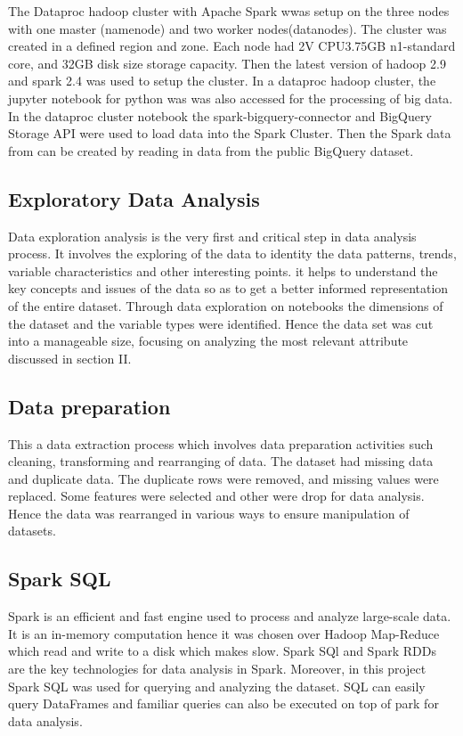 \documentclass[11pt]{article}
\begin{document}
The Dataproc hadoop cluster with Apache Spark wwas setup on the three nodes with one master (namenode) and two worker nodes(datanodes). The cluster was created in a defined region and zone. Each node had 2V CPU3.75GB n1-standard core, and 32GB disk size storage capacity. Then the latest version of hadoop 2.9 and spark 2.4 was used to setup the cluster. In a dataproc hadoop cluster, the jupyter notebook for python was was also accessed for the processing of big data.  In the dataproc cluster notebook the spark-bigquery-connector and BigQuery Storage API were used to  load data into the Spark Cluster. Then the Spark data from can be created by reading in data from the public BigQuery dataset. 

\subsection{ Exploratory Data Analysis}
Data exploration analysis is the very first and critical step in data analysis process. It involves the exploring of the data to identity the data patterns, trends, variable characteristics and other interesting points. it helps to understand the key concepts and issues of the data so as to get a better informed representation of the entire dataset. Through data exploration on notebooks the dimensions of the dataset and the variable types were identified. Hence the data set was cut into a manageable size, focusing on analyzing the most relevant attribute discussed in section II. 

\subsection{Data preparation}
 This a data extraction process which involves data preparation activities such cleaning, transforming and rearranging of data. The dataset had missing data and duplicate data. The duplicate rows were removed, and missing values were replaced. Some features were selected and other were drop for data analysis. Hence the data was rearranged in various ways to ensure  manipulation of datasets. 


\subsection{Spark SQL}
Spark is an efficient and fast engine used to process and analyze large-scale data. It is an in-memory computation hence it was chosen over Hadoop Map-Reduce which read  and write to a disk which makes slow. Spark SQl and Spark RDDs are the key technologies for data analysis in Spark. Moreover, in this project Spark SQL was used for querying  and analyzing the dataset. SQL can easily  query DataFrames and familiar queries can also be executed on top of park for data analysis.
\end{document}
